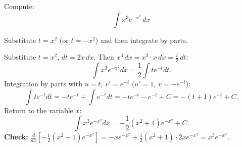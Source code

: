 
\begin{question}
Compute:
\[ \int x^3e^{-x^2}\,dx \]
\end{question}

\begin{hint}
Substitute $t=x^2$ (or $t=-x^2$) and then integrate by parts.
\end{hint}

\begin{solution}
Substitute $t=x^2$, $dt=2x\,dx$. Then $x^3\,dx=x^2\cdot x\,dx=\frac t2\,dt$:
\[ \int x^3e^{-x^2}dx=\frac12\int te^{-t}dt. \]
Integration by parts with $u=t$, $v'=e^{-t}$ ($u'=1$, $v=-e^{-t}$):
\[ \int te^{-t}dt=-te^{-t}+\int e^{-t}dt=-te^{-t}-e^{-t}+C=-(t+1)e^{-t}+C. \]
Return to the variable $x$:
\[ \boxed{\int x^3e^{-x^2}dx=-\frac12(x^2+1)e^{-x^2}+C.} \]
\textbf{Check:} $\frac{d}{dx}\left[-\frac12(x^2+1)e^{-x^2}\right]=-xe^{-x^2}+\frac12(x^2+1)\cdot2xe^{-x^2}=x^3e^{-x^2}$.
\end{solution}
